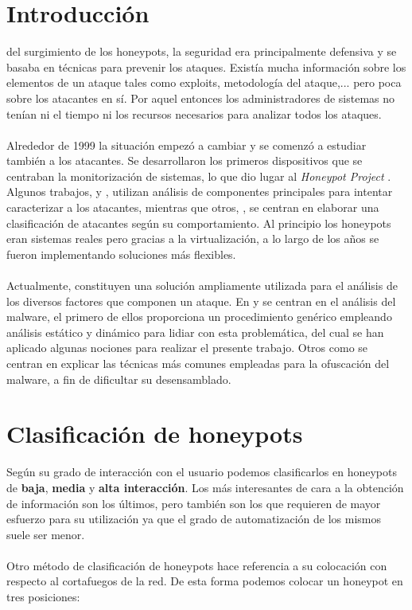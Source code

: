 \documentclass[journal]{IEEEtran}
\begin{document}
\section{Introducción}
 del surgimiento de los honeypots, la seguridad era principalmente defensiva y se basaba en técnicas para prevenir los ataques. Existía mucha información sobre los elementos de un ataque tales como exploits, metodología del ataque,... pero poca sobre los atacantes en sí. Por aquel entonces los administradores de sistemas no tenían ni el tiempo ni los recursos necesarios para analizar todos los ataques.
\\\\
Alrededor de 1999 la situación empezó a cambiar y se comenzó a estudiar también a los atacantes. Se desarrollaron los primeros dispositivos que se centraban la monitorización de sistemas, lo que dio lugar al {\it Honeypot Project} \cite{honeynet.project}. Algunos trabajos, \cite{almotairi2008characterization} y \cite{almotairi2009technique}, utilizan análisis de componentes principales para intentar caracterizar a los atacantes, mientras que otros, \cite{salles2011characterizing}, se centran en elaborar una clasificación de atacantes según su comportamiento. Al principio los honeypots eran sistemas reales pero gracias a la virtualización, a lo largo de los años se fueron implementando soluciones más flexibles.
\\\\
Actualmente, constituyen una solución ampliamente utilizada para el análisis de los diversos factores que componen un ataque. En \cite{kendall2007practical} y \cite{quist2009visualizing} se centran en el análisis del malware, el primero de ellos proporciona un procedimiento genérico empleando análisis estático y dinámico para lidiar con esta problemática, del cual se han aplicado algunas nociones para realizar el presente trabajo. Otros como \cite{ofuscation} se centran en explicar las técnicas más comunes empleadas para la ofuscación del malware, a fin de dificultar su desensamblado.

\section{Clasificación de honeypots}
Según su grado de interacción con el usuario podemos clasificarlos en honeypots de \textbf{baja}, \textbf{media} y \textbf{alta interacción}. Los más interesantes de cara a la obtención de información son los últimos, pero también son los que requieren de mayor esfuerzo para su utilización ya que el grado de automatización de los mismos suele ser menor.
\\\\
Otro método de clasificación de honeypots hace referencia a su colocación con respecto al cortafuegos de la red. De esta forma podemos colocar un honeypot en tres posiciones:
\end{document}
